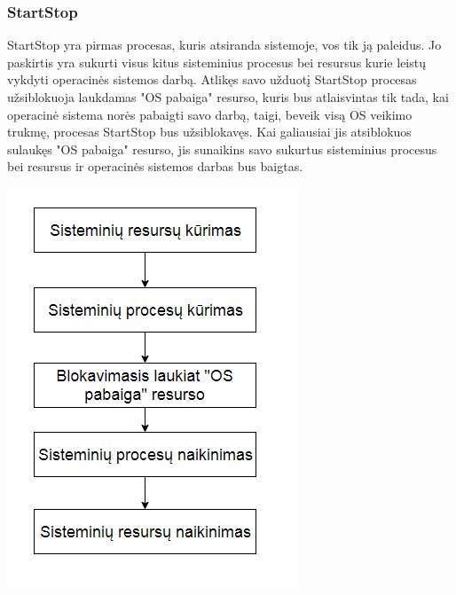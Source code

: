\documentclass{scrartcl}
\begin{document}
        \subsubsection{StartStop}
          StartStop yra pirmas procesas, kuris atsiranda sistemoje, vos tik ją paleidus. Jo paskirtis yra sukurti visus kitus sisteminius procesus bei resursus kurie leistų vykdyti operacinės sistemos darbą. Atlikęs savo užduotį StartStop procesas užsiblokuoja laukdamas "OS pabaiga" resurso, kuris bus atlaisvintas tik tada, kai operacinė sistema norės pabaigti savo darbą, taigi, beveik visą OS veikimo trukmę, procesas StartStop bus užsiblokavęs. Kai galiausiai jis atsiblokuos sulaukęs "OS pabaiga" resurso, jis sunaikins savo sukurtus sisteminius procesus bei resursus ir operacinės sistemos darbas bus baigtas.
          \begin{center}
            \includegraphics[scale=1]{StartStop}
          \end{center}
\end{document}
